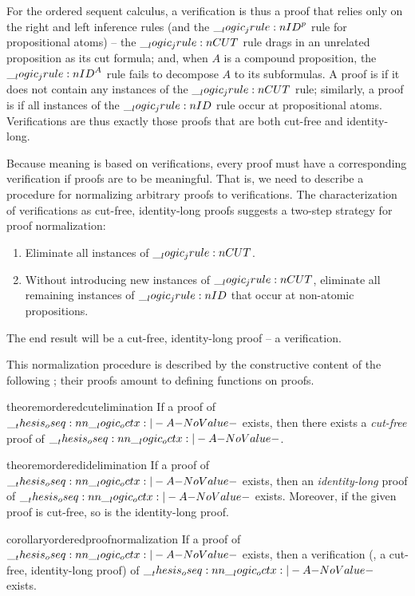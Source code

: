 For the ordered sequent calculus, a verification is thus a proof that relies only on the right and left inference rules (and the $\__logic_jrule:n {ID}^{p}$ rule for propositional atoms) -- the $\__logic_jrule:n {CUT}$ rule drags in an unrelated proposition as its cut formula; and, when $A$ is a compound proposition, the $\__logic_jrule:n {ID}^A$ rule fails to decompose $A$ to its subformulas.
A proof is  if it does not contain any instances of the $\__logic_jrule:n {CUT}$ rule; similarly, a proof is  if all instances of the $\__logic_jrule:n {ID}$ rule occur at propositional atoms.
Verifications are thus exactly those proofs that are both cut-free and identity-long.

Because meaning is based on verifications, every proof must have a corresponding verification if proofs are to be meaningful.
That is, we need to describe a procedure for normalizing arbitrary proofs to verifications.
The characterization of verifications as cut-free, identity-long proofs suggests a two-step strategy for proof normalization:
\begin{enumerate}[topsep=.33\baselineskip, noitemsep]
  \label{list:ordered-logic:normalization}
\item Eliminate all instances of $\__logic_jrule:n {CUT}$.
\item Without introducing new instances of $\__logic_jrule:n {CUT}$, eliminate all remaining instances of $\__logic_jrule:n {ID}$ that occur at non-atomic propositions.
\end{enumerate}
The end result will be a cut-free, identity-long proof -- a verification.

This normalization procedure is described by the constructive content of the following ; their proofs amount to defining functions on proofs.%
%
\begin{restatable*}[
      name=Cut elimination,
      label=thm:ordered-logic:cut-elimination
    ]{theorem}{orderedcutelimination}
      If a proof of\/ $\oseq{\octx |- A}$ exists, then there exists a \emph{cut-free} proof of\/ $\oseq{\octx |- A}$.
    \end{restatable*}
%
\begin{restatable*}[
      name=Identity elimination,
      label=thm:ordered-logic:identity-elimination
    ]{theorem}{orderedidelimination}
      If a proof of\/ $\oseq{\octx |- A}$ exists, then an \emph{identity-long} proof of\/ $\oseq{\octx |- A}$ exists.
      Moreover, if the given proof is cut-free, so is the identity-long proof.
    \end{restatable*}
%
\begin{restatable*}[
  name=Proof normalization,
  label=cor:ordered-logic:proof-normalization
]{corollary}{orderedproofnormalization}
  If a proof of\/ $\oseq{\octx |- A}$ exists, then a verification (\ie, a cut-free, identity-long proof) of\/ $\oseq{\octx |- A}$ exists.
\end{restatable*}

